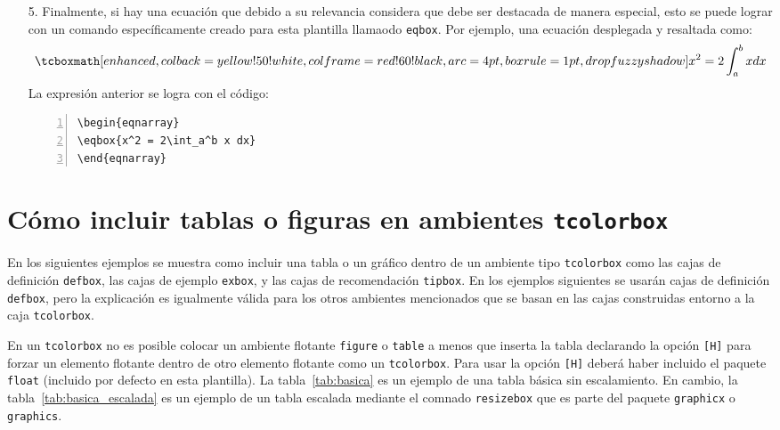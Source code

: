 \documentclass[11pt,letterpaper,twoside]{report}%
\begin{document}
\begin{tipbox}

\begin{enumerate}

\item[5.] Finalmente, si hay una ecuación que debido a su relevancia considera que debe ser destacada de manera especial, esto se puede lograr con un comando específicamente creado para esta plantilla llamaodo \verb|eqbox|.  Por ejemplo, una ecuación desplegada y resaltada como:
\begin{eqnarray}
\eqbox{x^2 = 2\int_a^b x dx}
\end{eqnarray}
La expresión anterior se logra con el código:
\begin{Verbatim}[frame=single,framesep=5mm,rulecolor=\color{gray},numbers=left,numbersep=-10pt]
\begin{eqnarray}
\eqbox{x^2 = 2\int_a^b x dx}
\end{eqnarray}
\end{Verbatim}

\end{enumerate}

\end{tipbox}


\section{Cómo incluir tablas o figuras en ambientes \texttt{tcolorbox}}\label{sec:tab_figs_tcolorbox}

En los siguientes ejemplos se muestra como incluir una tabla o un gráfico dentro de un ambiente tipo \texttt{tcolorbox} como las cajas de definición \texttt{defbox}, las cajas de ejemplo \texttt{exbox}, y las cajas de recomendación \texttt{tipbox}.  En los ejemplos siguientes se usarán cajas de definición \texttt{defbox}, pero la explicación es igualmente válida para los otros ambientes mencionados que se basan en las cajas construidas entorno a la caja \texttt{tcolorbox}.  

En un \texttt{tcolorbox} no es posible colocar un ambiente flotante \texttt{figure} o \texttt{table} a menos que inserta la tabla declarando la opción \texttt{[H]} para forzar un elemento flotante dentro de otro elemento flotante como un \texttt{tcolorbox}.  Para usar la opción \texttt{[H]} deberá haber incluido el paquete \texttt{float} (incluido por defecto en esta plantilla).  La tabla~\ref{tab:basica} es un ejemplo de una tabla básica sin escalamiento.  En cambio, la tabla~\ref{tab:basica_escalada} es un ejemplo de un tabla escalada mediante el comnado \texttt{resizebox} que es parte del paquete \texttt{graphicx} o \texttt{graphics}.
\end{document}
